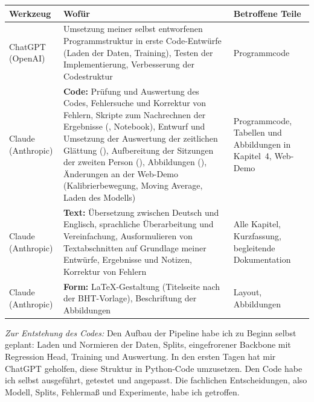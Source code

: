 \begin{center}
\footnotesize
\begin{tabularx}{\textwidth}{L{2.2cm} Y L{3.6cm}}
  \toprule
  \textbf{Werkzeug} & \textbf{Wofür} & \textbf{Betroffene Teile} \\
  \midrule
  ChatGPT (OpenAI) & Umsetzung meiner selbst entworfenen Programmstruktur in
                     erste Code-Entwürfe (Laden der Daten, Training), Testen
                     der Implementierung, Verbesserung der Codestruktur
                   & Programmcode \\
  \addlinespace
  Claude (Anthropic) & \textbf{Code:} Prüfung und Auswertung des Codes,
                     Fehlersuche und Korrektur von Fehlern, Skripte zum
                     Nachrechnen der Ergebnisse (,
                     Notebook), Entwurf und Umsetzung der Auswertung der
                     zeitlichen Glättung (),
                     Aufbereitung der Sitzungen der zweiten Person
                     (), Abbildungen
                     (), Änderungen an der Web-Demo
                     (Kalibrierbewegung, Moving Average, Laden des Modells)
                   & Programmcode, Tabellen und Abbildungen in Kapitel~4,
                     Web-Demo \\
  \addlinespace
  Claude (Anthropic) & \textbf{Text:} Übersetzung zwischen Deutsch und
                     Englisch, sprachliche Überarbeitung und Vereinfachung,
                     Ausformulieren von Textabschnitten auf Grundlage meiner
                     Entwürfe, Ergebnisse und Notizen, Korrektur von Fehlern
                   & Alle Kapitel, Kurzfassung, begleitende Dokumentation \\
  \addlinespace
  Claude (Anthropic) & \textbf{Form:} LaTeX-Gestaltung (Titelseite nach der
                     BHT-Vorlage), Beschriftung der Abbildungen
                   & Layout, Abbildungen \\
  \bottomrule
\end{tabularx}
\end{center}

\textit{Zur Entstehung des Codes:} Den Aufbau der Pipeline habe ich zu Beginn
selbst geplant: Laden und Normieren der Daten, Splits, eingefrorener Backbone
mit Regression Head, Training und Auswertung. In den ersten Tagen hat mir
ChatGPT geholfen, diese Struktur in Python-Code umzusetzen. Den Code habe ich
selbst ausgeführt, getestet und angepasst. Die fachlichen Entscheidungen, also
Modell, Splits, Fehlermaß und Experimente, habe ich getroffen.

